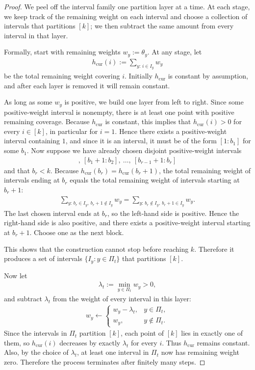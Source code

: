 \documentclass{article}
\theoremstyle{plain}
\theoremstyle{definition}
\theoremstyle{plain}
\begin{document}
\begin{proof}
We peel off the interval family one partition layer at a time. At each stage, we keep track of the remaining weight on each interval and choose a collection of intervals that partitions $[k]$; we then subtract the same amount from every interval in that layer.

Formally, start with remaining weights $w_y:=\theta_y$. At any stage, let
\begin{align*}
    h_{\mathrm{cur}}(i):=\sum_{y:\, i\in I_y} w_y
\end{align*}
be the total remaining weight covering $i$. Initially $h_{\mathrm{cur}}$ is constant by assumption, and after each layer is removed it will remain constant.

As long as some $w_y$ is positive, we build one layer from left to right. Since some positive-weight interval is nonempty, there is at least one point with positive remaining coverage. Because $h_{\mathrm{cur}}$ is constant, this implies that $h_{\mathrm{cur}}(i)>0$ for every $i\in [k]$, in particular for $i=1$. Hence there exists a positive-weight interval containing $1$, and since it is an interval, it must be of the form $[1:b_1]$ for some $b_1$.
Now suppose we have already chosen disjoint positive-weight intervals
\begin{align*}
    [1:b_1],\ [b_1+1:b_2],\ \dots,\ [b_{r-1}+1:b_r]
\end{align*}
and that $b_r<k$. Because $h_{\mathrm{cur}}(b_r)=h_{\mathrm{cur}}(b_r+1)$, the total remaining weight of intervals ending at $b_r$ equals the total remaining weight of intervals starting at $b_r+1$:
\begin{align*}
    \sum_{y:\, b_r\in I_y,\ b_r+1\notin I_y} w_y
    =
    \sum_{y:\, b_r\notin I_y,\ b_r+1\in I_y} w_y.
\end{align*}
The last chosen interval ends at $b_r$, so the left-hand side is positive. Hence the right-hand side is also positive, and there exists a positive-weight interval starting at $b_r+1$. Choose one as the next block.

This shows that the construction cannot stop before reaching $k$. Therefore it produces a set of intervals $\{I_y:y\in \Pi_t\}$ that partitions $[k]$.

Now let
\begin{align*}
    \lambda_t:=\min_{y\in \Pi_t} w_y>0,
\end{align*}
and subtract $\lambda_t$ from the weight of every interval in this layer:
\begin{align*}
    w_y\leftarrow
    \begin{cases}
    w_y-\lambda_t, & y\in \Pi_t,\\
    w_y, & y\notin \Pi_t.
    \end{cases}
\end{align*}
Since the intervals in $\Pi_t$ partition $[k]$, each point of $[k]$ lies in exactly one of them, so $h_{\mathrm{cur}}(i)$ decreases by exactly $\lambda_t$ for every $i$. Thus $h_{\mathrm{cur}}$ remains constant. Also, by the choice of $\lambda_t$, at least one interval in $\Pi_t$ now has remaining weight zero. Therefore the process terminates after finitely many steps.


\end{proof}
\end{document}
